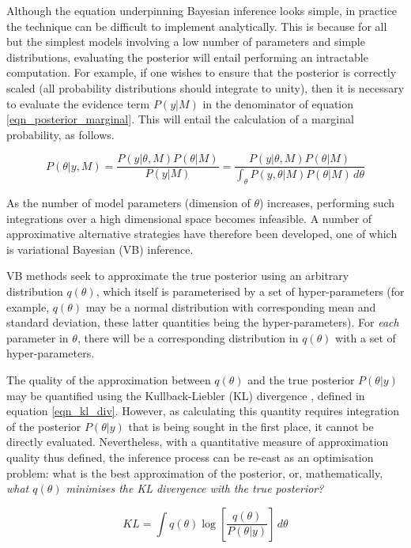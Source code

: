 \documentclass[12pt]{report}
\begin{document}
Although the equation underpinning Bayesian inference looks simple, in practice the technique can be difficult to implement analytically. This is because for all but the simplest models involving a low number of parameters and simple distributions, evaluating the posterior will entail performing an intractable computation. For example, if one wishes to ensure that the posterior is correctly scaled (all probability distributions should integrate to unity), then it is necessary to evaluate the evidence term $P(y | M)$ in the denominator of equation \ref{eqn_posterior_marginal}. This will entail the calculation of a marginal probability, as follows. 

\begin{equation} 
P(\theta | y, M) = \frac{ P(y | \theta, M) P(\theta | M) }{ P(y | M) }= \frac{ P(y | \theta, M) P(\theta | M) }{ \int_{\theta} P(y,\theta | M)P(\theta | M) \,d\theta }
\label{eqn_posterior_marginal}
\end{equation}

As the number of model parameters (dimension of $\theta$) increases, performing such integrations over a high dimensional space becomes infeasible. A number of approximative alternative strategies have therefore been developed, one of which is variational Bayesian (VB) inference. 

VB methods seek to approximate the true posterior using an arbitrary distribution $q(\theta)$, which itself is parameterised by a set of hyper-parameters (for example, $q(\theta)$ may be a normal distribution with corresponding mean and standard deviation, these latter quantities being the hyper-parameters). For \textit{each} parameter in $\theta$, there will be a corresponding distribution in $q(\theta)$ with a set of hyper-parameters. 

The quality of the approximation between $q(\theta)$ and the true posterior $P(\theta | y)$ may be quantified using the Kullback-Liebler (KL) divergence \cite{Wani2020}, defined in equation \ref{eqn_kl_div}. However, as calculating this quantity requires integration of the posterior $P(\theta|y)$ that is being sought in the first place, it cannot be directly evaluated. Nevertheless, with a quantitative measure of approximation quality thus defined, the inference process can be re-cast as an optimisation problem: what is the best approximation of the posterior, or, mathematically, \textit{what $q(\theta)$ minimises the KL divergence with the true posterior?}

\begin{equation} 
KL = \int q(\theta) \log{ \left[ \frac{ q(\theta)  }{ P(\theta|y) } \right] } \, d\theta
\label{eqn_kl_div}
\end{equation}
\end{document}

